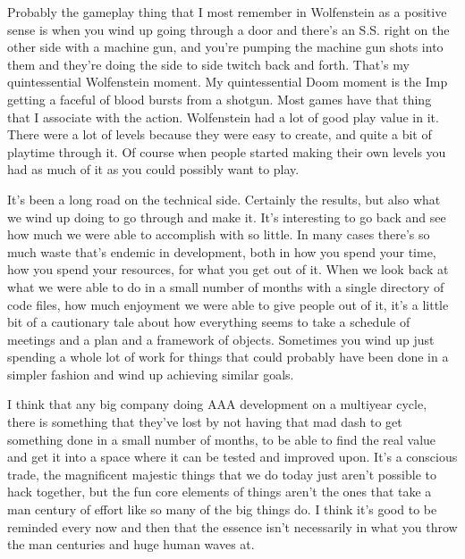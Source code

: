 Probably the gameplay thing that I most remember in Wolfenstein as a positive sense is when you wind up going through a door and there's an S.S. right on the other side with a machine gun, and you're pumping the machine gun shots into them and they're doing the side to side twitch back and forth. That's my quintessential Wolfenstein moment. My quintessential Doom moment is the Imp getting a faceful of blood bursts from a shotgun. Most games have that thing that I associate with the action. Wolfenstein had a lot of good play value in it. There were a lot of levels because they were easy to create, and quite a bit of playtime through it. Of course when people started making their own levels you had as much of it as you could possibly want to play.\\ \par

It's been a long road on the technical side. Certainly the results, but also what we wind up doing to go through and make it. It's interesting to go back and see how much we were able to accomplish with so little. In many cases there's so much waste that's endemic in development, both in how you spend your time, how you spend your resources, for what you get out of it. When we look back at what we were able to do in a small number of months with a single directory of code files, how much enjoyment we were able to give people out of it, it's a little bit of a cautionary tale about how everything seems to take a schedule of meetings and a plan and a framework of objects. Sometimes you wind up just spending a whole lot of work for things that could probably have been done in a simpler fashion and wind up achieving similar goals.\\ \par 

I think that any big company doing AAA development on a multiyear cycle, there is something that they've lost by not having that mad dash to get something done in a small number of months, to be able to find the real value and get it into a space where it can be tested and improved upon. It's a conscious trade, the magnificent majestic things that we do today just aren't possible to hack together, but the fun core elements of things aren't the ones that take a man century of effort like so many of the big things do. I think it's good to be reminded every now and then that the essence isn't necessarily in what you throw the man centuries and huge human waves at.
